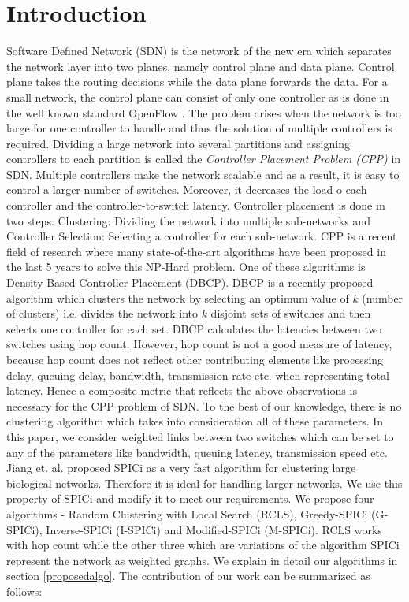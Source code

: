 \documentclass[times]{dacauth}
\begin{document}
\vspace{-6pt}

\section{Introduction}

Software Defined Network (SDN) is the network of the new era which separates the network layer into two planes, namely control plane and data plane. Control plane takes the routing decisions while the data plane forwards the data. For a small network, the control plane can consist of only one controller as is done in the well known standard OpenFlow \cite{hu2014survey}. The problem arises when the network is too large for one controller to handle and thus the solution of multiple controllers is required. Dividing a large network into several partitions and assigning controllers to each partition is called the \emph{Controller Placement Problem (CPP)} in SDN. Multiple controllers make the network scalable and as a result, it is easy to control a larger number of switches. Moreover, it decreases the load o each controller and the controller-to-switch latency. Controller placement is done in two steps: Clustering: Dividing the network into multiple sub-networks and
Controller Selection: Selecting a controller for each sub-network.
CPP is a recent field of research where many state-of-the-art algorithms have been proposed in the last 5 years to solve this NP-Hard problem. One of these algorithms is Density Based Controller Placement (DBCP)\cite{dbcp2017}. DBCP is a recently proposed algorithm which clusters the network by selecting an optimum value of $k$ (number of clusters) i.e. divides the network into $k$ disjoint sets of switches and then selects one controller for each set. DBCP calculates the latencies between two switches using hop count. However, hop count is not a good measure of latency, because hop count does not reflect other contributing elements like processing delay, queuing delay, bandwidth, transmission rate etc. when representing total latency. Hence a composite metric that reflects the above observations is necessary for the CPP problem of SDN. To the best of our knowledge, there is no clustering algorithm which takes into consideration all of these parameters. In this paper, we consider weighted links between two switches which can be set to any of the parameters like bandwidth, queuing latency, transmission speed etc. 
Jiang et. al.\cite{spici2010} proposed SPICi as a very fast algorithm for clustering large biological networks. Therefore it is ideal for handling larger networks. We use this property of SPICi and modify it to meet our requirements. We propose four algorithms - Random Clustering with Local Search (RCLS), Greedy-SPICi (G-SPICi), Inverse-SPICi (I-SPICi) and Modified-SPICi (M-SPICi). RCLS works with hop count while the other three which are variations of the algorithm SPICi represent the network as weighted graphs. We explain in detail our algorithms in section \ref{proposedalgo}. The contribution of our work can be summarized as follows:
\end{document}
